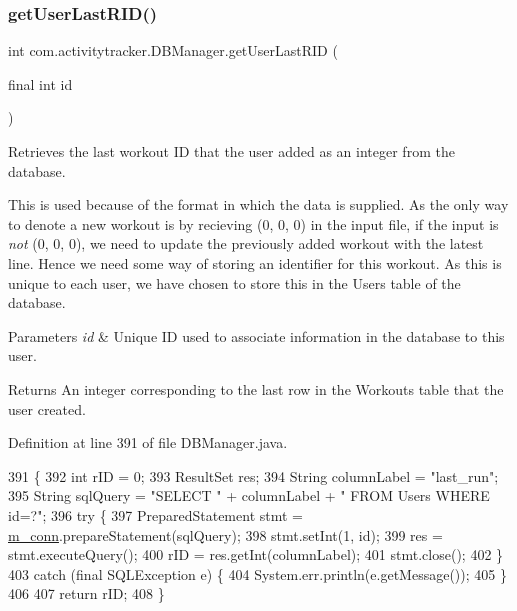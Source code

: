 \subsubsection{\texorpdfstring{get\+User\+Last\+R\+I\+D()}{getUserLastRID()}}
{\footnotesize\ttfamily int com.\+activitytracker.\+D\+B\+Manager.\+get\+User\+Last\+R\+ID (\begin{DoxyParamCaption}\item[{final int}]{id }\end{DoxyParamCaption})}

Retrieves the last workout ID that the user added as an integer from the database.

This is used because of the format in which the data is supplied. As the only way to denote a new workout is by recieving (0, 0, 0) in the input file, if the input is {\itshape not} (0, 0, 0), we need to update the previously added workout with the latest line. Hence we need some way of storing an identifier for this workout. As this is unique to each user, we have chosen to store this in the Users table of the database.


\begin{DoxyParams}{Parameters}
{\em id} & Unique ID used to associate information in the database to this user. \\
\hline
\end{DoxyParams}
\begin{DoxyReturn}{Returns}
An integer corresponding to the last row in the Workouts table that the user created. 
\end{DoxyReturn}


Definition at line 391 of file D\+B\+Manager.\+java.


\begin{DoxyCode}
391                                             \{
392         \textcolor{keywordtype}{int} rID = 0;
393         ResultSet res;
394         String columnLabel = \textcolor{stringliteral}{"last\_run"};
395         String sqlQuery = \textcolor{stringliteral}{"SELECT "} + columnLabel + \textcolor{stringliteral}{" FROM Users WHERE id=?"};
396         \textcolor{keywordflow}{try} \{
397             PreparedStatement stmt = \mbox{\hyperlink{classcom_1_1activitytracker_1_1_d_b_manager_a064088d13ac09eb147fdc19268771521}{m\_conn}}.prepareStatement(sqlQuery);
398             stmt.setInt(1, \textcolor{keywordtype}{id});
399             res = stmt.executeQuery();
400             rID = res.getInt(columnLabel);
401             stmt.close();
402         \}
403         \textcolor{keywordflow}{catch} (\textcolor{keyword}{final} SQLException e) \{
404             System.err.println(e.getMessage());
405         \}
406 
407         \textcolor{keywordflow}{return} rID;
408     \}
\end{DoxyCode}
\mbox{\label{classcom_1_1activitytracker_1_1_d_b_manager_aeab864b072cc08c0521e80ae1f459ca7}} 
